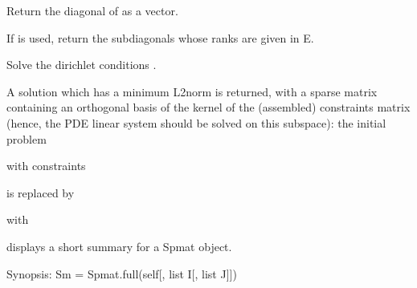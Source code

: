 \documentclass[a4paper,11pt,english]{sphinxmanual}
\begin{document}
\begin{fulllineitems}

\begin{fulllineitems}
\label{\detokenize{python/cmdref_Spmat:getfem.Spmat.diag}}
Return the diagonal of  as a vector.

If  is used, return the sub\sphinxhyphen{}diagonals whose ranks are given in E.

\end{fulllineitems}


\begin{fulllineitems}
\label{\detokenize{python/cmdref_Spmat:getfem.Spmat.dirichlet_nullspace}}
Solve the dirichlet conditions .

A solution  which has a minimum L2\sphinxhyphen{}norm is returned, with a
sparse matrix  containing an orthogonal basis of the kernel of
the (assembled) constraints matrix  (hence, the PDE linear system
should be solved on this subspace): the initial problem

 with constraints 

is replaced by

 with 

\end{fulllineitems}


\begin{fulllineitems}
\label{\detokenize{python/cmdref_Spmat:getfem.Spmat.display}}
displays a short summary for a Spmat object.

\end{fulllineitems}


\begin{fulllineitems}
\label{\detokenize{python/cmdref_Spmat:getfem.Spmat.full}}
Synopsis: Sm = Spmat.full(self{[}, list I{[}, list J{]}{]})


\end{fulllineitems}
\end{fulllineitems}
\end{document}
